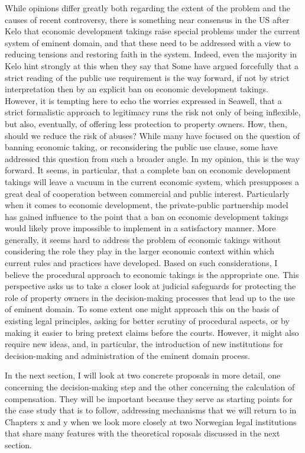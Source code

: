 {While opinions differ greatly both regarding the extent of the problem and the causes of recent controversy, there is something near consensus in the US after Kelo that economic development takings raise special problems under the current system of eminent domain, and that these need to be addressed with a view to reducing tensions and restoring faith in the system. Indeed, even the majority in Kelo hint strongly at this when they say that  
Some have argued forcefully that a strict reading of the public use requirement is the way forward, if not by strict interpretation then by an explicit ban on economic development takings.  However, it is tempting here to echo the worries expressed in Seawell, that a strict formalistic approach to legitimacy runs the risk not only of being inflexible, but also, eventually, of offering less  protection to property owners. How, then, should we reduce the risk of abuses?
While many have focused on the question of banning economic taking, or reconsidering the public use clause, some have addressed this question from such a broader angle. In my opinion, this is the way forward. It seems, in particular, that a complete ban on economic development takings will leave a vacuum in the current economic system, which presupposes a great deal of cooperation between commercial and public interest. Particularly when it comes to economic development, the private-public partnership model has gained influence to the point that a ban on economic development takings would likely prove impossible to implement in a satisfactory manner. 
More generally, it seems hard to address the problem of economic takings without considering the role they play in the larger economic context within which current rules and practices have developed. Based on such considerations, I believe the procedural approach to economic takings is the appropriate one. This perspective asks us to take a closer look at judicial safeguards for protecting the role of property owners in the decision-making processes that lead up to the use of eminent domain. To some extent one might approach this on the basis of existing legal principles, asking for better scrutiny of procedural aspects, or by making it easier to bring pretext claims before the courts. However, it might also require new ideas, and, in particular, the introduction of new institutions for decision-making and administration of the eminent domain process.

In the next section, I will look at two concrete proposals in more detail, one concerning the decision-making step and the other concerning the calculation of compensation. 
They will be important because they serve as starting points for the case study that is to follow, addressing mechanisms that we will return to in Chapters x and y when we look more closely at two Norwegian legal institutions that share many features with the theoretical roposals discussed in the next section.
}

